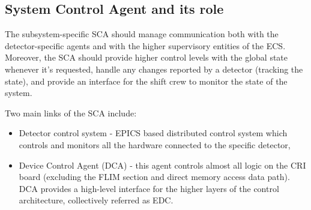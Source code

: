 \subsection{System Control Agent and its role}
The subsystem-specific \gls{SCA} should manage communication both with the detector-specific agents and with the higher supervisory entities of the \gls{ECS}. Moreover, the \gls{SCA} should provide higher control levels with the global state whenever it's requested, handle any changes reported by a detector (tracking the state), and provide an interface for the shift crew to monitor the state of the system. 

Two main links of the \gls{SCA} include:
\begin{itemize}
    \item Detector control system - \gls{EPICS} based distributed control system which controls and monitors all the hardware connected to the specific detector,
    \item Device Control Agent (\gls{DCA}) - this agent controls almost all logic on the \gls{CRI} board (excluding the \gls{FLIM} section and direct memory access data path). \gls{DCA} provides a high-level interface for the higher layers of the control architecture, collectively referred as \gls{EDC}. 
\end{itemize}










